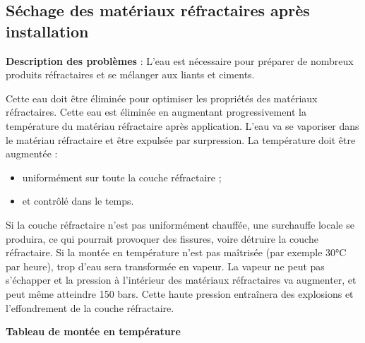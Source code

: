 \subsection{Séchage des matériaux réfractaires après installation}

\textbf{Description des problèmes} : L'eau est nécessaire pour préparer de nombreux produits réfractaires et se mélanger aux liants et ciments. 

Cette eau doit être éliminée pour optimiser les propriétés des matériaux réfractaires.
\vspace{0.3cm}
Cette eau est éliminée en augmentant progressivement la température du matériau réfractaire après application. L'eau va se vaporiser dans le matériau réfractaire et être expulsée par surpression.
La température doit être augmentée :
\begin{itemize}
    \item uniformément sur toute la couche réfractaire ;
    \item et contrôlé dans le temps.
\end{itemize}

Si la couche réfractaire n'est pas uniformément chauffée, une surchauffe locale se produira, ce qui pourrait provoquer des fissures, voire détruire la couche réfractaire.
\vspace{0.3cm}
Si la montée en température n'est pas maîtrisée (par exemple 30°C par heure), trop d'eau sera transformée en vapeur. La vapeur ne peut pas s'échapper et la pression à l'intérieur des matériaux réfractaires va augmenter, et peut même atteindre 150 bars. Cette haute pression entraînera des explosions et l'effondrement de la couche réfractaire.

\vspace{0.3cm}
\textbf{Tableau de montée en température}
\vspace{0.3cm}

